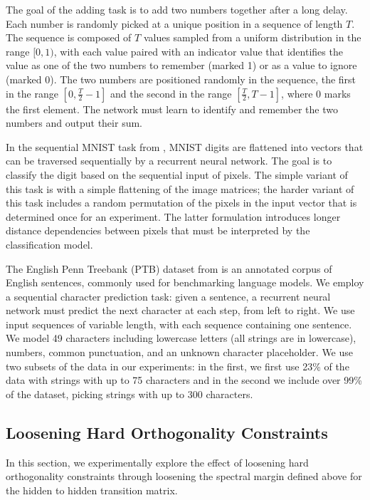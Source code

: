 \documentclass{article} %
\begin{document}
The goal of the adding task is to add two numbers together after a long delay. Each number is randomly picked at a unique position in a sequence of length ${\mathit{T}}$. The sequence is composed of ${\mathit{T}}$ values sampled from a uniform distribution in the range ${[0,1)}$, with each value paired with an indicator value that identifies the value as one of the two numbers to remember (marked 1) or as a value to ignore (marked 0). The two numbers are positioned randomly in the sequence, the first in the range ${[0, \frac{T}{2}-1]}$ and the second in the range ${[\frac{T}{2}, T-1]}$, where 0 marks the first element. The network must learn to identify and remember the two numbers and output their sum.

In the sequential MNIST task from \citet{le2015simple}, MNIST digits are flattened into vectors that can be traversed sequentially by a recurrent neural network. The goal is to classify the digit based on the sequential input of pixels. The simple variant of this task is with a simple flattening of the image matrices; the harder variant of this task includes a random permutation of the pixels in the input vector that is determined once for an experiment. The latter formulation introduces longer distance dependencies between pixels that must be interpreted by the classification model.

The English Penn Treebank (PTB) dataset from \citet{marcus1993building} is an annotated corpus of English sentences, commonly used for benchmarking language models. We employ a sequential character prediction task: given a sentence, a recurrent neural network must predict the next character at each step, from left to right. We use input sequences of variable length, with each sequence containing one sentence. We model 49 characters including lowercase letters (all strings are in lowercase), numbers, common punctuation, and an unknown character placeholder. We use two subsets of the data in our experiments: in the first, we first use 23\% of the data with strings with up to 75 characters and in the second we include over 99\% of the dataset, picking strings with up to 300 characters.


\subsection{Loosening Hard Orthogonality Constraints}

In this section, we experimentally explore the effect of loosening hard orthogonality constraints through loosening the spectral margin defined above for the hidden to hidden transition matrix.
\end{document}
